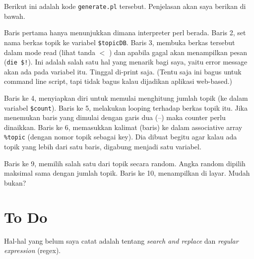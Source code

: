 Berikut ini adalah kode \texttt{generate.pl} tersebut.
Penjelasan akan saya berikan di bawah.

\lstset{
  numbers=left,
  firstnumber=1,
  numberfirstline=true
}

\lstset{numbers=none}

Baris pertama hanya menunjukkan dimana interpreter perl berada.
Baris 2, set nama berkas topik ke variabel \texttt{\$topicDB}.
Baris 3, membuka berkas tersebut dalam mode read
(lihat tanda $<$ ) dan apabila gagal akan menampilkan
pesan (\texttt{die \$!}).
Ini adalah salah satu hal yang menarik bagi saya,
yaitu error message akan ada pada variabel itu.
Tinggal di-print saja.
(Tentu saja ini bagus untuk command line script,
tapi tidak bagus kalau dijadikan aplikasi web-based.)

Baris ke 4, menyiapkan diri untuk memulai menghitung
jumlah topik (ke dalam variabel \texttt{\$count}).
Baris ke 5, melakukan looping terhadap berkas topik itu.
Jika menemukan baris yang dimulai dengan garis dua
(--) maka counter perlu dinaikkan.
Baris ke 6, memasukkan kalimat (baris) ke dalam 
associative array \texttt{\%topic} (dengan nomor topik
sebagai key).
Dia dibuat begitu agar kalau ada topik yang lebih dari
satu baris, digabung menjadi satu variabel.

Baris ke 9, memilih salah satu dari topik secara random.
Angka random dipilih maksimal sama dengan jumlah
topik.
Baris ke 10, menampilkan di layar. Mudah bukan?

\section{To Do}
Hal-hal yang belum saya catat adalah tentang {\em search and replace}
dan {\em regular expression} (regex).

